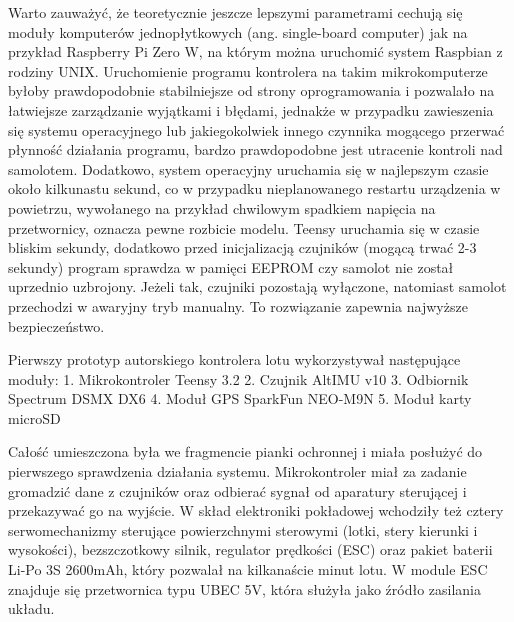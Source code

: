 \documentclass[12pt, a4paper]{article}
\begin{document}
Warto zauważyć, że teoretycznie jeszcze lepszymi parametrami cechują się moduły komputerów jednopłytkowych (ang. single-board computer) jak na przykład Raspberry Pi Zero W, na którym można uruchomić system Raspbian z rodziny UNIX. Uruchomienie programu kontrolera na takim mikrokomputerze byłoby prawdopodobnie stabilniejsze od strony oprogramowania i pozwalało na łatwiejsze zarządzanie wyjątkami i błędami, jednakże w przypadku zawieszenia się systemu operacyjnego lub jakiegokolwiek innego czynnika mogącego przerwać płynność działania programu, bardzo prawdopodobne jest utracenie kontroli nad samolotem. Dodatkowo, system operacyjny uruchamia się w najlepszym czasie około kilkunastu sekund, co w przypadku nieplanowanego restartu urządzenia w powietrzu, wywołanego na przykład chwilowym spadkiem napięcia na przetwornicy, oznacza pewne rozbicie modelu. Teensy uruchamia się w czasie bliskim sekundy, dodatkowo przed inicjalizacją czujników (mogącą trwać 2-3 sekundy) program sprawdza w pamięci EEPROM czy samolot nie został uprzednio uzbrojony. Jeżeli tak, czujniki pozostają wyłączone, natomiast samolot przechodzi w awaryjny tryb manualny. To rozwiązanie zapewnia najwyższe bezpieczeństwo.

Pierwszy prototyp autorskiego kontrolera lotu wykorzystywał następujące moduły:
1.	Mikrokontroler Teensy 3.2
2.	Czujnik AltIMU v10
3.	Odbiornik Spectrum DSMX DX6
4.	Moduł GPS SparkFun NEO-M9N
5.	Moduł karty microSD

Całość umieszczona była we fragmencie pianki ochronnej i miała posłużyć do pierwszego sprawdzenia działania systemu. Mikrokontroler miał za zadanie gromadzić dane z czujników oraz odbierać sygnał od aparatury sterującej i przekazywać go na wyjście. W skład elektroniki pokładowej wchodziły też cztery serwomechanizmy sterujące powierzchnymi sterowymi (lotki, stery kierunki i wysokości), bezszczotkowy silnik, regulator prędkości (ESC) oraz pakiet baterii Li-Po 3S 2600mAh, który pozwalał na kilkanaście minut lotu. W module ESC znajduje się przetwornica typu UBEC 5V, która służyła jako źródło zasilania układu.
 
\end{document}
